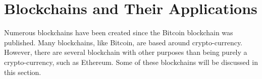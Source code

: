 





\section{Blockchains and Their Applications}
Numerous blockchains have been created since the Bitcoin blockchain was published. Many blockchains, like Bitcoin, are based around crypto-currency. However, there are several blockchain with other purposes than being purely a crypto-currency, such as Ethereum. Some of these blockchains will be discussed in this section.

